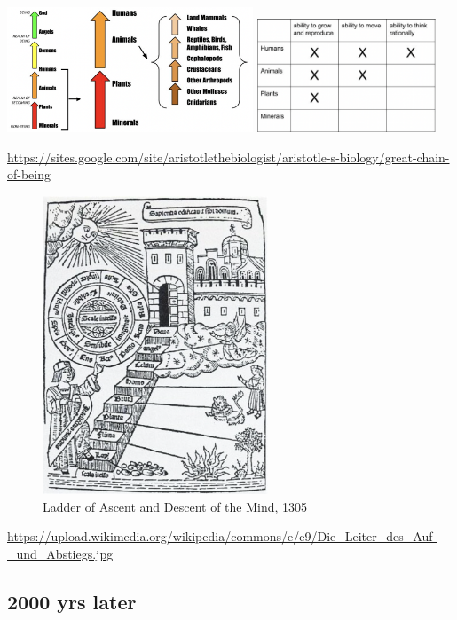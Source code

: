 \documentclass[
]{book}
\begin{document}
\includegraphics[width=0.55\textwidth,height=\textheight]{./Figures/Scala1.png}
\includegraphics[width=0.4\textwidth,height=\textheight]{./Figures/Scala2.png}

\url{https://sites.google.com/site/aristotlethebiologist/aristotle-s-biology/great-chain-of-being}

\begin{figure}
\centering
\includegraphics[width=0.6\textwidth,height=\textheight]{./Figures/Scala3.png}
\caption{Ladder of Ascent and Descent of the Mind, 1305}
\end{figure}

\url{https://upload.wikimedia.org/wikipedia/commons/e/e9/Die_Leiter_des_Auf-_und_Abstiegs.jpg}

\hypertarget{yrs-later}{%
\subsection*{2000 yrs later}\label{yrs-later}}
\end{document}

